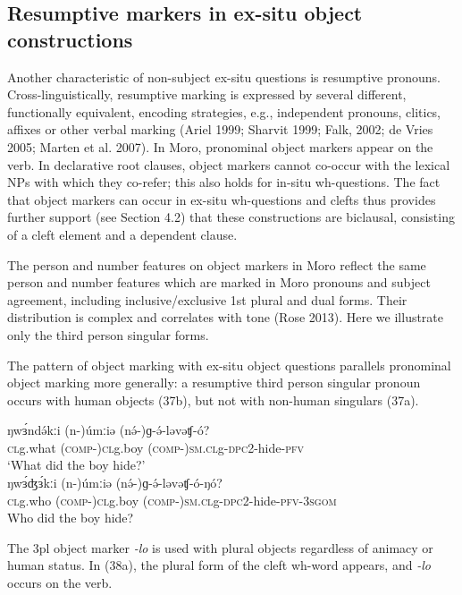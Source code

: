 \subsection{Resumptive markers in ex-situ object constructions}
Another characteristic of non-subject ex-situ questions is resumptive pronouns. Cross-linguistically, resumptive marking is expressed by several different, functionally equivalent, encoding strategies, e.g., independent pronouns, clitics, affixes or other verbal marking (Ariel 1999; Sharvit 1999; Falk, 2002; de Vries 2005; Marten et al. 2007). In Moro, pronominal object markers appear on the verb. In declarative root clauses, object markers cannot co-occur with the lexical NPs with which they co-refer; this also holds for in-situ wh-questions. The fact that object markers can occur in ex-situ wh-questions and clefts thus provides further support (see Section 4.2) that these constructions are biclausal, consisting of a cleft element and a dependent clause.

The person and number features on object markers in Moro reflect the same person and number features which are marked in Moro pronouns and subject agreement, including inclusive/exclusive 1st plural and dual forms. Their distribution is complex and correlates with tone (Rose 2013). Here we illustrate only the third person singular forms.

The pattern of object marking with ex-situ object questions parallels pronominal object marking more generally: a resumptive third person singular pronoun occurs with human objects (37b), but not with non-human singulars (37a).


\ea
\ea \gll	ŋwɜ́ndə́kːi	(n-)úmːiə	(nə́-)ɡ-ə́-ləvəʧ-ó?	\\
		\textsc{cl}g.what	(\textsc{comp-})\textsc{cl}g.boy	(\textsc{comp-})\textsc{sm.cl}g-\textsc{dpc}2-hide-\textsc{pfv}\\
\trans		‘What did the boy hide?’\\
\ex \gll	ŋwɜ́ʤɜ́kːi	(n-)úmːiə	(nə́-)ɡ-ə́-ləvəʧ-ó-ŋó?\\
		\textsc{cl}g.who	(\textsc{comp-})\textsc{cl}g.boy	(\textsc{comp-})\textsc{sm.cl}g-\textsc{dpc}2-hide-\textsc{pfv}-3\textsc{sgom}\\
\trans		Who did the boy hide?\\
\z
\z

The 3pl object marker \textit{-lo} is used with plural objects regardless of animacy or human status. In (38a), the plural form of the cleft wh-word appears, and \textit{-lo} occurs on the verb. 

